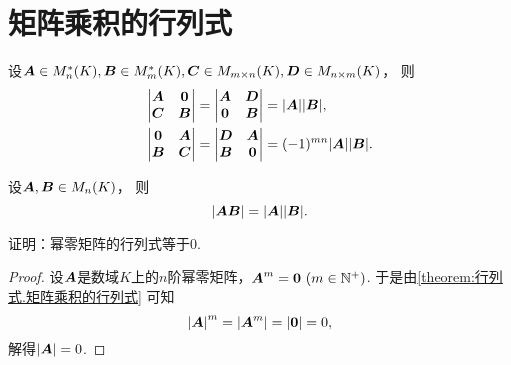 \section{矩阵乘积的行列式}
\begin{lemma}
设\(\boldsymbol{A}\in M_n^*(K),
\boldsymbol{B}\in M_m^*(K),
\boldsymbol{C}\in M_{m\times n}(K),
\boldsymbol{D}\in M_{n\times m}(K)\)，
则\begin{align}
	\begin{vmatrix}
		\boldsymbol{A} & \boldsymbol0 \\
		\boldsymbol{C} & \boldsymbol{B}
	\end{vmatrix}
	&= \begin{vmatrix}
		\boldsymbol{A} & \boldsymbol{D} \\
		\boldsymbol0 & \boldsymbol{B}
	\end{vmatrix}
	= \abs{\boldsymbol{A}} \abs{\boldsymbol{B}}, \label{equation:行列式.广义三角阵的行列式1} \\
	\begin{vmatrix}
		\boldsymbol0 & \boldsymbol{A} \\
		\boldsymbol{B} & \boldsymbol{C}
	\end{vmatrix}
	&= \begin{vmatrix}
		\boldsymbol{D} & \boldsymbol{A} \\
		\boldsymbol{B} & \boldsymbol0
	\end{vmatrix}
	= (-1)^{mn} \abs{\boldsymbol{A}} \abs{\boldsymbol{B}}. \label{equation:行列式.广义三角阵的行列式2}
\end{align}
\end{lemma}

\begin{theorem}[矩阵乘积的行列式定理]\label{theorem:行列式.矩阵乘积的行列式}
设\(\boldsymbol{A},\boldsymbol{B}\in M_n(K)\)，
则\begin{equation}
	\abs{\boldsymbol{A} \boldsymbol{B}} = \abs{\boldsymbol{A}} \abs{\boldsymbol{B}}.
\end{equation}
\end{theorem}

\begin{example}\label{example:幂零矩阵.幂零矩阵的行列式}
证明：幂零矩阵的行列式等于\(0\).
\begin{proof}
设\(\boldsymbol{A}\)是数域\(K\)上的\(n\)阶幂零矩阵，\(\boldsymbol{A}^m = \boldsymbol0\ (m\in\mathbb{N}^+)\).
于是由\cref{theorem:行列式.矩阵乘积的行列式} 可知\[
	\abs{\boldsymbol{A}}^m
	= \abs{\boldsymbol{A}^m}
	= \abs{\boldsymbol0}
	= 0,
\]
解得\(\abs{\boldsymbol{A}} = 0\).
\end{proof}
\end{example}

